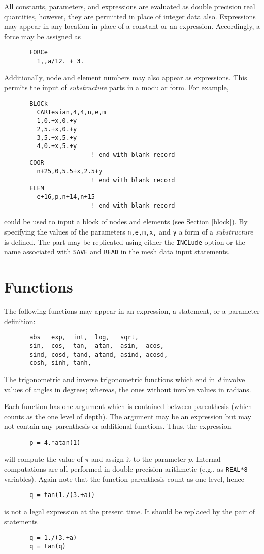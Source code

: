 All constants, parameters, and expressions are evaluated as double
precision real quantities, however, they are permitted in place of integer
data also.  Expressions may appear in any location
in place of a constant or an expression.  Accordingly, a force may
be assigned as
\begin{verbatim}
       FORCe
         1,,a/12. + 3.
\end{verbatim}
Additionally, node and element numbers may also
appear as expressions.  This permits the input of {\it substructure}
parts in a modular form.  For example,
\begin{verbatim}
       BLOCk
         CARTesian,4,4,n,e,m
         1,0.+x,0.+y
         2,5.+x,0.+y
         3,5.+x,5.+y
         4,0.+x,5.+y
                        ! end with blank record
       COOR
         n+25,0,5.5+x,2.5+y
                        ! end with blank record
       ELEM
         e+16,p,n+14,n+15
                        ! end with blank record
\end{verbatim}
could be used to input a block of nodes and elements (see Section \ref{block}).
By specifying
the values of the parameters {\tt n,e,m,x,} and {\tt y} a form of a
{\it substructure} is defined.  The part may be replicated using either
the {\tt INCLude} option or the
name associated with {\tt SAVE} and {\tt READ} in the mesh
data input statements.

\section{Functions}

The following functions may appear in an expression, a statement, or a
parameter definition:
\begin{verbatim}
       abs   exp,  int,  log,   sqrt,
       sin,  cos,  tan,  atan,  asin,  acos,
       sind, cosd, tand, atand, asind, acosd,
       cosh, sinh, tanh,
\end{verbatim}
The trigonometric and inverse trigonometric functions which end in {\it d}
involve values of angles in degrees; whereas, the ones without involve values
in radians.

Each function has one argument which is contained between parenthesis
(which counts as the one level of depth).  The argument may be an
expression but may not contain any parenthesis or additional functions.
Thus, the expression
\begin{verbatim}
       p = 4.*atan(1)
\end{verbatim}
will compute the value of $\pi$ and assign it to the parameter $p$.
Internal computations are all performed in double precision arithmetic (e.g.,
as {\tt REAL*8} variables).
Again note that the function parenthesis count as one level, hence
\begin{verbatim}
       q = tan(1./(3.+a))
\end{verbatim}
is not a legal expression at the present time.
It should be replaced by the pair of statements
\begin{verbatim}
       q = 1./(3.+a)
       q = tan(q)
\end{verbatim}

